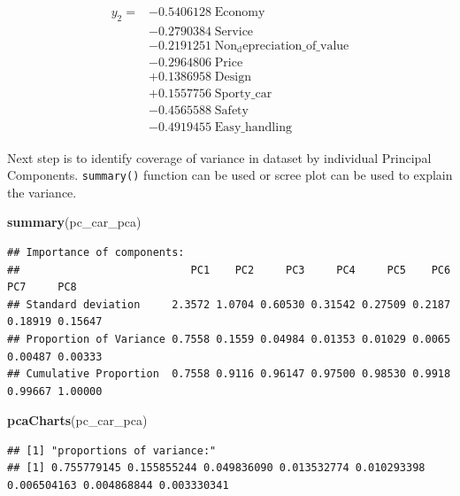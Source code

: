 \documentclass[]{article}
\newenvironment{Shaded}{\begin{snugshade}}{\end{snugshade}}
\newcommand{\KeywordTok}[1]{\textcolor[rgb]{0.13,0.29,0.53}{\textbf{#1}}}
\newcommand{\NormalTok}[1]{#1}
\begin{document}
\[
\begin{align*}
y_2 = 
    & -0.5406128\;  \mathrm{Economy} \\
    & -0.2790384\;  \mathrm{Service}    \\
    & -0.2191251\;  \mathrm{Non_depreciation\_of\_value} \\
    & -0.2964806\;  \mathrm{Price} \\
    &+ 0.1386958\;  \mathrm{Design}   \\
    &+ 0.1557756\;  \mathrm{Sporty\_car}  \\
    & -0.4565588\;  \mathrm{Safety}  \\
    & -0.4919455\;  \mathrm{Easy\_handling}  
\end{align*}
\]

Next step is to identify coverage of variance in dataset by individual
Principal Components. \texttt{summary()} function can be used or scree
plot can be used to explain the variance.

\begin{Shaded}
\begin{Highlighting}[]
\KeywordTok{summary}\NormalTok{(pc_car_pca)}
\end{Highlighting}
\end{Shaded}

\begin{verbatim}
## Importance of components:
##                           PC1    PC2     PC3     PC4     PC5    PC6     PC7     PC8
## Standard deviation     2.3572 1.0704 0.60530 0.31542 0.27509 0.2187 0.18919 0.15647
## Proportion of Variance 0.7558 0.1559 0.04984 0.01353 0.01029 0.0065 0.00487 0.00333
## Cumulative Proportion  0.7558 0.9116 0.96147 0.97500 0.98530 0.9918 0.99667 1.00000
\end{verbatim}

\begin{Shaded}
\begin{Highlighting}[]
\KeywordTok{pcaCharts}\NormalTok{(pc_car_pca)}
\end{Highlighting}
\end{Shaded}

\begin{verbatim}
## [1] "proportions of variance:"
## [1] 0.755779145 0.155855244 0.049836090 0.013532774 0.010293398 0.006504163 0.004868844 0.003330341
\end{verbatim}
\end{document}
